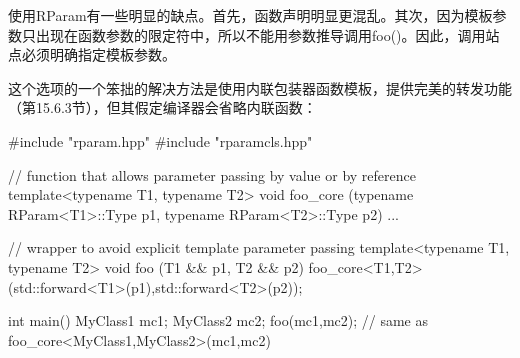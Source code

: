 使用RParam有一些明显的缺点。首先，函数声明明显更混乱。其次，因为模板参数只出现在函数参数的限定符中，所以不能用参数推导调用foo()。因此，调用站点必须明确指定模板参数。

这个选项的一个笨拙的解决方法是使用内联包装器函数模板，提供完美的转发功能（第15.6.3节），但其假定编译器会省略内联函数：

\begin{cpp}
#include "rparam.hpp"
#include "rparamcls.hpp"

// function that allows parameter passing by value or by reference
template<typename T1, typename T2>
void foo_core (typename RParam<T1>::Type p1,
				typename RParam<T2>::Type p2)
{
	...
}

// wrapper to avoid explicit template parameter passing
template<typename T1, typename T2>
void foo (T1 && p1, T2 && p2)
{
	foo_core<T1,T2>(std::forward<T1>(p1),std::forward<T2>(p2));
}

int main()
{
	MyClass1 mc1;
	MyClass2 mc2;
	foo(mc1,mc2); // same as foo_core<MyClass1,MyClass2>(mc1,mc2)
}
\end{cpp}











